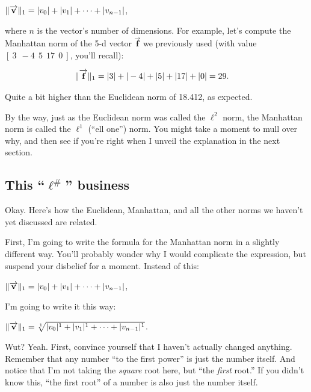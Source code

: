 \begin{center}
$\lVert\overrightarrow{\textbf{v}}\rVert_1 = |v_0| + |v_1| + \cdots + |v_{n-1}|$,
\end{center}

where $n$ is the vector's number of dimensions. For example, let's compute the
Manhattan norm of the 5-d vector $\overrightarrow{\textbf{f}}$ we previously
used (with value $[\ 3\ \ -4\ \ 5\ \ 17\ \ 0\ ]$, you'll recall):

\vspace{-.15in}
\begin{align*}
\lVert\overrightarrow{\textbf{f}}\rVert_1 &= |3| + |-4| + |5| + |17| + |0| = 29.
\end{align*}

Quite a bit higher than the Euclidean norm of 18.412, as expected.

By the way, just as the Euclidean norm was called the $\ell^2$ norm, the
Manhattan norm is called the $\ell^1$ (``ell one'') norm. You might take a
moment to mull over why, and then see if you're right when I unveil the
explanation in the next section.

\subsection{This ``$\boldsymbol\ell^\textbf{\#}$'' business}

Okay. Here's how the Euclidean, Manhattan, and all the other norms we haven't
yet discussed are related.

First, I'm going to write the formula for the Manhattan norm in a slightly
different way. You'll probably wonder why I would complicate the expression,
but suspend your disbelief for a moment. Instead of this:

\begin{center}
$\lVert\overrightarrow{\textbf{v}}\rVert_1 = |v_0| + |v_1| + \cdots + |v_{n-1}|$,
\end{center}

I'm going to write it this way:

\begin{center}
$\lVert\overrightarrow{\textbf{v}}\rVert_1 = \sqrt[1]{|v_0|^1 + |v_1|^1 + \cdots +
|v_{n-1}|^1}$.
\end{center}

Wut? Yeah. First, convince yourself that I haven't actually changed anything.
Remember that any number ``to the first power'' is just the number itself. And
notice that I'm not taking the \textit{square} root here, but ``the
\textit{first} root.'' If you didn't know this, ``the first root'' of a number
is also just the number itself.

